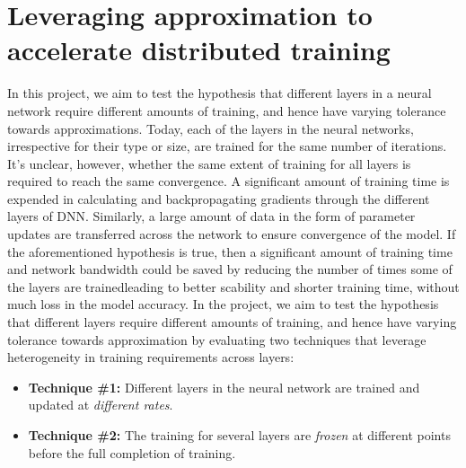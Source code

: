 \section{Leveraging approximation to accelerate distributed training}
In this project, we aim to test the hypothesis that different layers in a neural network require different amounts of training, and hence have varying tolerance towards approximations. Today, each of the layers in the neural networks, irrespective for their type or size, are trained for the same number of iterations. It's unclear, however, whether the same extent of training for all layers is required to reach the same convergence. A significant amount of training time is expended in calculating and backpropagating gradients through the different layers of DNN. Similarly, a large amount of data in the form of parameter updates are transferred across the network to ensure convergence of the model. If the aforementioned hypothesis is true, then a significant amount of training time and network bandwidth could be saved by reducing the number of times some of the layers are trained{\textemdash}leading to better scability and shorter training time, without much loss in the model accuracy. In the project, we aim to test the hypothesis that different layers require different amounts of training, and hence have varying tolerance towards approximation by evaluating two techniques that leverage heterogeneity in training requirements across layers:                
\begin{itemize}
\item \textbf{Technique \#1:} Different layers in the neural network are trained and updated at \emph{different rates}.
\item \textbf{Technique \#2:} The training for several layers are \emph{frozen} at different points before the full completion of training. 
\end{itemize}

